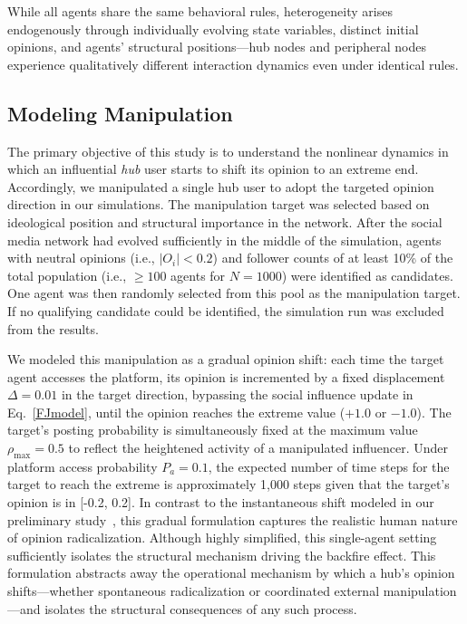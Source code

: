 \documentclass[pdflatex,sn-mathphys-num]{sn-jnl}%
\theoremstyle{thmstyleone}%
\theoremstyle{thmstyletwo}%
\theoremstyle{thmstylethree}%
\def\dgreen#1{\textcolor[rgb]{0.02,0.55,0.04}{#1}}
\def\Dgreen{\color[rgb]{0.02,0.55,0.04}}
\def\Black{\color[rgb]{0,0,0}}
\begin{document}
\dgreen{While all agents share the same behavioral rules, heterogeneity 
arises endogenously through individually evolving state variables, 
distinct initial opinions, and agents' structural positions---hub
nodes and peripheral nodes experience qualitatively
different interaction dynamics even under identical rules.}


\subsection{Modeling Manipulation}
\Dgreen
The primary objective of this study is to 
understand the nonlinear dynamics in which an influential \emph{hub} 
user starts to shift its opinion to an extreme end. Accordingly, we manipulated a single hub user to adopt the targeted opinion direction in our simulations. The manipulation target was selected based on ideological position and structural importance in the network. After the social media network had evolved sufficiently in the middle of the simulation, 
agents with neutral opinions (i.e., $|O_i| < 0.2$) and 
follower counts of at least 10\% of the total population (i.e., $\geq 100$ agents for $N = 1000$) 
were identified as candidates. One agent was then randomly selected from this pool as the manipulation target. If no qualifying candidate could be identified, the simulation run was excluded from the results.
\par

We modeled this manipulation as a gradual opinion shift: each time the target agent accesses the platform, its opinion is incremented by a fixed displacement $\Delta = 0.01$ in the target direction, bypassing the social influence update in Eq.~\eqref{FJmodel}, until the opinion reaches the extreme value ($+1.0$ or $-1.0$). The target's posting probability is simultaneously fixed at the maximum value $\rho_{\max} = 0.5$ to reflect the heightened activity of a manipulated influencer. Under platform access probability $P_a = 0.1$, the expected number of time steps for the target to 
reach the extreme is approximately 1,000 steps given that the target's opinion is in [-0.2, 0.2]. 
In contrast to the instantaneous shift modeled in our preliminary study~\cite{Takeda2026}, 
this gradual formulation captures 
the realistic human nature of opinion radicalization. 
Although highly simplified, this single-agent setting sufficiently isolates the structural mechanism driving the backfire effect.
This formulation abstracts away the operational mechanism 
by which a hub's opinion shifts---whether spontaneous radicalization or
coordinated external manipulation---and
isolates the structural consequences of any such process.
\Black
\par
\end{document}

